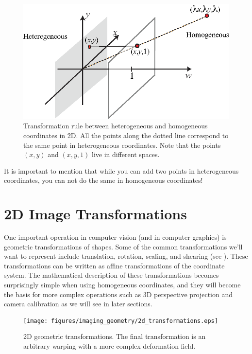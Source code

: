 \begin{figure}
\centerline{
\includegraphics[width=0.7\linewidth]{figures/imaging_geometry/homogeneousAndHeteregeneous_VS3.eps}
}
\caption{Transformation rule between heterogeneous and homogeneous coordinates in 2D. All the points along the dotted line correspond to the same point in heterogeneous coordinates. Note that the points $(x,y)$ and $(x,y,1)$ live in different spaces.}
\label{fig:homogeneousAndHeteregeneous}
\end{figure}

It is important to mention that while you can add two points in heterogeneous coordinates, you can not do the same in homogeneous coordinates!


\section{2D Image Transformations}
\label{sect:2dtransforms}

One important operation in computer vision (and in computer graphics) is geometric transformations of shapes. Some of the common transformations we'll want to represent include  translation, rotation, scaling, and shearing (see \fig{\ref{fig:2dtransformations_clock}}). These transformations can be written as affine transformations of the coordinate system. The mathematical description of these transformations becomes surprisingly simple when using homogeneous coordinates, and they will become the basis for more complex operations such as 3D perspective projection and camera calibration as we will see in later sections.


\begin{figure}
\centerline{
\texttt{[image: figures/imaging\_geometry/2d\_transformations.eps]}
}
\caption{2D geometric transformations. 
The final transformation is an arbitrary warping with a more complex deformation field.}
\label{fig:2dtransformations_clock}
\end{figure}

